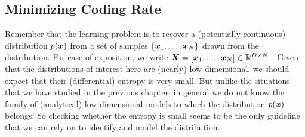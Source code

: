 \documentclass[../../book-main.tex]{subfiles}
\begin{document}




\subsection{Minimizing Coding Rate}\label{sub:min_entropy}
Remember that the learning problem is to recover a  (potentially continuous)  distribution $p(\bm{x})$ from a set of samples $\{\bm{x}_1, \ldots, \bm{x}_N\}$ drawn from the distribution. For ease of exposition, we write $\bm{X} = [\bm{x}_1, \ldots, \bm{x}_N] \in \mathbb{R}^{D\times N}$ . Given that the distributions of interest here are (nearly) low-dimensional, we should expect that their (differential) entropy is very small. But unlike the situations that we have studied in the previous chapter, in general we do not know the family of (analytical) low-dimensional models to which the distribution $p(\bm{x})$ belongs. So checking whether the entropy is small seems to be the only guideline that we can rely on to identify and model the distribution.
\end{document}
